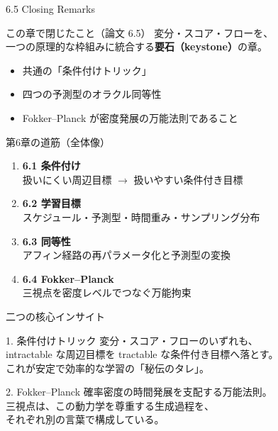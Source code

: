 

\begin{frame}{6.5 Closing Remarks}
    \begin{block}{この章で閉じたこと（論文 6.5）}
        変分・スコア・フローを、\\
        一つの原理的な枠組みに統合する\textbf{要石（keystone）}の章。
    \end{block}
    \begin{itemize}
        \item 共通の「条件付けトリック」
        \item 四つの予測型のオラクル同等性
        \item Fokker--Planck が密度発展の万能法則であること
    \end{itemize}
\end{frame}
\asmain
\begin{frame}{第6章の道筋（全体像）}
    \begin{enumerate}
        \item \textbf{6.1 条件付け}\\
        扱いにくい周辺目標 $\to$ 扱いやすい条件付き目標
        \item \textbf{6.2 学習目標}\\
        スケジュール・予測型・時間重み・サンプリング分布
        \item \textbf{6.3 同等性}\\
        アフィン経路の再パラメータ化と予測型の変換
        \item \textbf{6.4 Fokker--Planck}\\
        三視点を密度レベルでつなぐ万能拘束
    \end{enumerate}
\end{frame}
\asmain
\begin{frame}{二つの核心インサイト}
    \begin{block}{1. 条件付けトリック}
        変分・スコア・フローのいずれも、\\
         intractable な周辺目標を tractable な条件付き目標へ落とす。\\
        これが安定で効率的な学習の「秘伝のタレ」。
    \end{block}
    \begin{block}{2. Fokker--Planck}
        確率密度の時間発展を支配する万能法則。\\
        三視点は、この動力学を尊重する生成過程を、\\
        それぞれ別の言葉で構成している。
    \end{block}
\end{frame}
